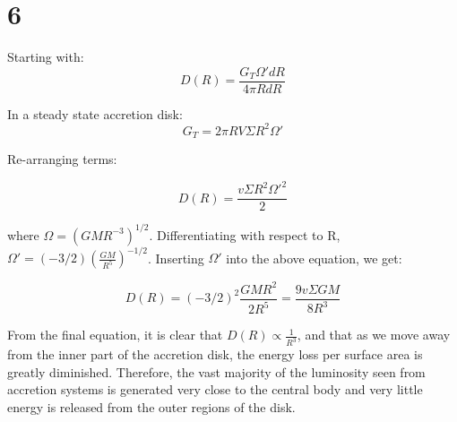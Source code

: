 \documentclass{article}
\begin{document}
\section*{6}

Starting with:
\begin{equation}
D(R) = \frac{G_T \Omega' dR}{4 \pi RdR}
\end{equation}

In a steady state accretion disk:
\begin{equation}
G_T = 2 \pi R V \Sigma R^2 \Omega'
\end{equation}

Re-arranging terms:

\begin{equation}
D(R) = \frac{v \Sigma R^2\Omega'^2}{2}
\end{equation}

where $\Omega = (GMR^{-3})^{1/2}$. Differentiating with respect to R, $\Omega' = (-3/2) (\frac{GM}{R^5})^{-1/2}$. Inserting $\Omega'$ into the above equation, we get:

\begin{equation}
D(R) = (-3/2)^2 \frac{GMR^2}{2R^5}= \frac{9v\Sigma GM}{8R^3}
\end{equation}

From the final equation, it is clear that $D(R) \propto \frac{1}{R^3}$, and that as we move away from the inner part of the accretion disk, the energy loss per surface area is greatly diminished. Therefore, the vast majority of the luminosity seen from accretion systems is generated very close to the central body and very little energy is released from the outer regions of the disk.
\end{document}
